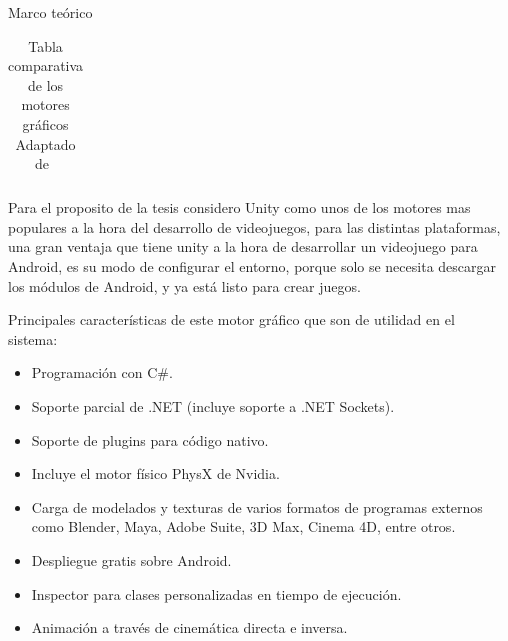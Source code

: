 \begin{thesischapter}{1} {Marco teórico}
\begin{table}[ht]
\begin{tabularx}{\textwidth}{|X|X|X|X|X|X|X|}
        \end{tabularx}
        \label{tab: graphics-engines}
        \caption{ Tabla comparativa de los motores gráficos \\ Adaptado de~\cite{gonjar2019desarrollo}}
    \end{table}
    
    
    \vspace{10pt}
    Para el proposito de la tesis considero Unity como unos de los motores mas populares a la hora del desarrollo
    de videojuegos, para las distintas plataformas, una gran ventaja que tiene unity a la hora de
    desarrollar un videojuego para Android, es su modo de configurar el entorno, porque solo se necesita descargar los módulos de 
    Android, y ya está listo para crear juegos.
     
    \vspace{5pt}
    Principales características de este motor gráfico que son de utilidad en el sistema:~\cite{unity3d}
    \begin{itemize}
        \item Programación con C\#.
        \item Soporte parcial de .NET (incluye soporte a .NET Sockets).
        \item Soporte de plugins para código nativo.
        \item Incluye el motor físico PhysX de Nvidia.
        \item Carga de modelados y texturas de varios formatos de programas externos como Blender, Maya, Adobe Suite, 3D Max, Cinema 4D, entre otros.
        \item Despliegue gratis sobre Android.
        \item Inspector para clases personalizadas en tiempo de ejecución.
        \item Animación a través de cinemática directa e inversa.
    \end{itemize}


\end{thesischapter}
